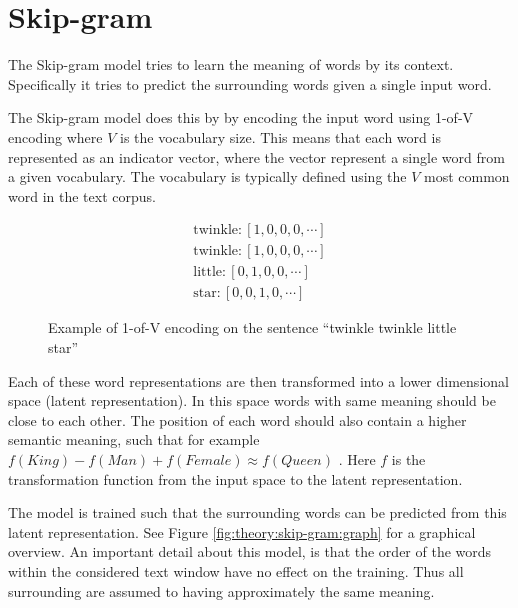 
\section{Skip-gram}

The Skip-gram model tries to learn the meaning of words by its context. Specifically it tries to predict the surrounding words given a single input word.

The Skip-gram model does this by by encoding the input word using 1-of-V encoding where $V$ is the vocabulary size. This means that each word is represented as an indicator vector, where the vector represent a single word from a given vocabulary. The vocabulary is typically defined using the $V$ most common word in the text corpus. 
\begin{figure}[h]
\begin{equation*}
\begin{aligned}
\text{twinkle}: \left[1, 0, 0, 0, \cdots \right] \\
\text{twinkle}: \left[1, 0, 0, 0, \cdots \right] \\
\text{little}: \left[0, 1, 0, 0, \cdots \right] \\
\text{star}: \left[0, 0, 1, 0, \cdots \right]
\end{aligned}
\end{equation*}
\caption{Example of 1-of-V encoding on the sentence ``twinkle twinkle little star''}
\end{figure}

Each of these word representations are then transformed into a lower dimensional space (latent representation). In this space words with same meaning should be close to each other. The position of each word should also contain a higher semantic meaning, such that for example $f(King) - f(Man) + f(Female) \approx f(Queen)$ \cite{word2vec-comparing}. Here $f$ is the transformation function from the input space to the latent representation.

The model is trained such that the surrounding words can be predicted from this latent representation. See Figure \ref{fig:theory:skip-gram:graph} for a graphical overview. An important detail about this model, is that the order of the words within the considered text window have no effect on the training. Thus all surrounding are assumed to having approximately the same meaning.

